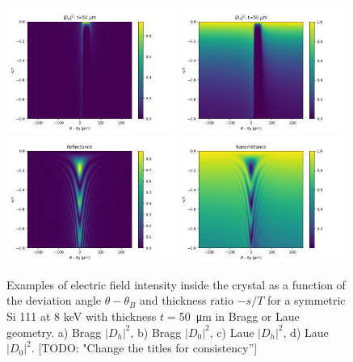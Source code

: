 \documentclass[preprint]{iucr}              %
\newcommand{\todo}[1]{{\color{red}[TODO: "#1'']}}
\begin{document}
\begin{figure}\label{fig:braggMap}
    \centering
    \includegraphics[width=0.49\textwidth]{figures/Bragg_DH.png}
    \includegraphics[width=0.49\textwidth]{figures/Bragg_D0.png}
    \includegraphics[width=0.49\textwidth]{figures/Laue_DH.png}
    \includegraphics[width=0.49\textwidth]{figures/Laue_D0.png}
    \caption{Examples of electric field intensity inside the crystal as a function of the 
    deviation angle $\theta-\theta_B$ and thickness ratio $-s/T$ for a symmetric Si 111 at 8 keV with thickness $t=$\SI{50}{\micro\meter} in Bragg or Laue geometry. 
    a) Bragg $|D_h|^2$, b) Bragg $|D_0|^2$,
    c) Laue $|D_h|^2$, d) Laue $|D_0|^2$.
    \todo{Change the titles for consistency}
    }
\end{figure}
\end{document}
